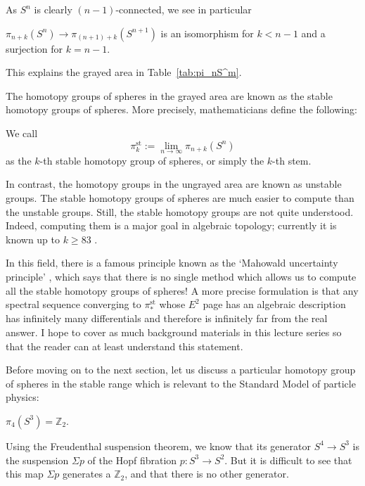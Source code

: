 \documentclass[12pt]{article}
\numberwithin{equation}{section}
\def\bZ{\mathbb{Z}}
\begin{document}
As $S^n$ is clearly $(n-1)$-connected, we see in particular 
\begin{proposition}
  $\pi_{n+k}(S^n)\to \pi_{(n+1)+k}(S^{n+1})$ 
  is an isomorphism for $k<n-1$ and a surjection for $k=n-1$.
\end{proposition}
This explains the grayed area in Table~\ref{tab:pi_nS^m}.

The homotopy groups of spheres in the grayed area 
are known as the stable homotopy groups of spheres.
More precisely, mathematicians define the following:
\begin{definition}
  We call \begin{equation}
   \pi^\text{st}_k := \lim_{n\to\infty} \pi_{n+k}(S^n)
  \end{equation}
as the $k$-th stable homotopy group of spheres,
or simply the $k$-th stem.
\end{definition}

In contrast, the homotopy groups in the ungrayed area
are known as unstable groups.
The stable homotopy groups of spheres are much easier to compute than the unstable groups.
Still, the stable homotopy groups are not quite understood.
Indeed, computing them is a major goal in algebraic topology;
currently it is known up to $k\ge 83$ \cite{Isaksen}.

In this field, there is a famous principle known as the 
`Mahowald uncertainty principle' \cite[Sec.~3]{IsaksenICM},
which says 
that there is no single method 
which allows us to compute all the stable homotopy groups of spheres!
A more precise formulation is that 
any spectral sequence converging to $\pi^\text{st}_*$ 
whose $E^2$ page has an algebraic description 
has infinitely many differentials 
and therefore is infinitely far from the real answer.
I hope to cover as much background materials in this lecture series so that 
the reader can at least understand this statement.

Before moving on to the next section,
let us discuss a particular homotopy group of spheres in the stable range
which is relevant to the Standard Model of particle physics:
\begin{example}
  $\pi_4(S^3)=\bZ_2$.
\end{example}
Using the Freudenthal suspension theorem,
we know that its generator $S^4\to S^3$ is the suspension $\Sigma p$
of the Hopf fibration $p:S^3\to S^2$.
But it is difficult to see that this map $\Sigma p$ 
generates a $\bZ_2$, and that there is no other generator.
  
\end{document}
